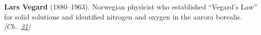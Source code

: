 \textbf{Lars Vegard} (1880–1963). Norwegian physicist who established ``Vegard's Law'' for solid solutions and identified nitrogen and oxygen in the aurora borealis. \emph{[Ch.~\hyperref[ch:osmosisdebye]{31}]}

